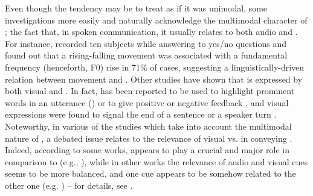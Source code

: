 \documentclass[output=paper]{langsci/langscibook}
\begin{document}
Even though the tendency may be to treat  as if it was unimodal, some investigations more easily and naturally acknowledge the multimodal character of ; the fact that, in spoken communication, it usually relates to both audio and . For instance, \citet{Cave1996} recorded ten subjects while answering to yes\slash no questions and found out that a rising-falling  movement was associated with a fundamental frequency (henceforth, F0) rise in 71\% of cases, suggesting a linguistically-driven relation between  movement and . Other studies have shown that  is expressed by both visual and . In fact,  has been reported to be used to highlight prominent words in an utterance (\citealt{Krahmer2007,Swerts2008}) or to give positive or negative feedback \citep{Barkhuysen2005}, and  visual expressions were found to signal the end of a sentence or a speaker turn \citep{Barkhuysen2008}. Noteworthy, in various of the studies which take into account the multimodal nature of , a debated issue relates to the relevance of visual vs.  in conveying . Indeed, according to some works,  appears to play a crucial and major role in comparison to  (e.g., \citealt{House2002,Dijkstra2006,Dohen2009,Srinivasan2003}), while in other works the relevance of audio and visual cues seems to be more balanced, and one cue appears to be somehow related to the other one (e.g. \citealt{CrespoSendra2013}) -- for details, see .
\end{document}
